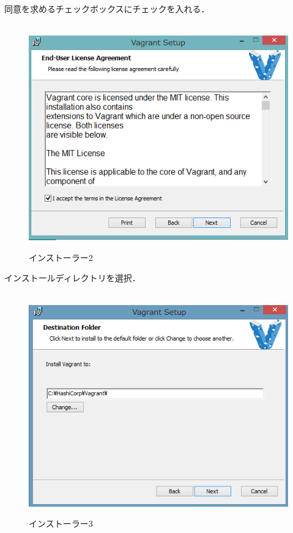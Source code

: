 同意を求めるチェックボックスにチェックを入れる．
\begin{figure}[htbp]
\centering　
\includegraphics[width=13cm]{vagrant4.png}
\caption{インストーラー2}
\end{figure}

インストールディレクトリを選択．
\begin{figure}[htbp]
\centering　
\includegraphics[width=13cm]{vagrant5.png}
\caption{インストーラー3}
\end{figure}

